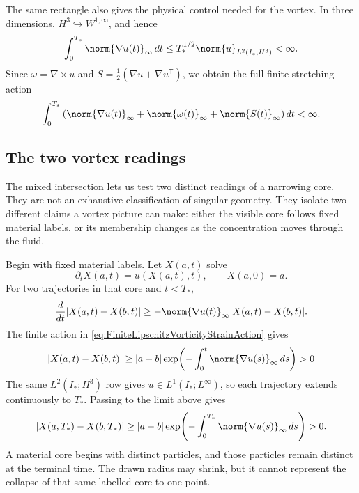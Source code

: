 The same rectangle also gives the physical control needed for the vortex.  In three dimensions,
\(H^3\hookrightarrow W^{1,\infty}\), and hence
\[
  \int_0^{T_*}\norm{\nabla u(t)}_\infty\,dt
  \leq
  T_*^{1/2}\norm{u}_{L^2(I_*;H^3)}<\infty.
\]
Since \(\omega=\nabla\times u\) and \(S=\tfrac12(\nabla u+\nabla u^{\mathsf T})\),
we obtain the full finite stretching action
\begin{equation}\label{eq:FiniteLipschitzVorticityStrainAction}
  \int_0^{T_*}
  \left(
    \norm{\nabla u(t)}_\infty
    +\norm{\omega(t)}_\infty
    +\norm{S(t)}_\infty
  \right)dt
  <\infty.
\end{equation}

\subsection{The two vortex readings}\label{sub:ClosingCriticalHeightZenoAndTheVortex}

The mixed intersection lets us test two distinct readings of a narrowing core.
They are not an exhaustive classification of singular geometry.
They isolate two different claims a vortex picture can make: either the visible core follows fixed material labels, or its membership changes as the concentration moves through the fluid.

Begin with fixed material labels.
Let \(X(a,t)\) solve
\[
  \partial_tX(a,t)=u(X(a,t),t),
  \qquad
  X(a,0)=a.
\]
For two trajectories in that core and \(t<T_*\),
\[
  \frac d{dt}|X(a,t)-X(b,t)|
  \geq
  -\norm{\nabla u(t)}_\infty|X(a,t)-X(b,t)|.
\]
The finite action in \eqref{eq:FiniteLipschitzVorticityStrainAction} gives
\begin{equation}\label{eq:BodyMaterialCoreLowerBound}
  |X(a,t)-X(b,t)|
  \geq
  |a-b|
  \exp\!\left(
    -\int_0^t\norm{\nabla u(s)}_\infty\,ds
  \right)
  >0
\end{equation}
The same \(L^2(I_*;H^3)\) row gives \(u\in L^1(I_*;L^\infty)\), so each trajectory
extends continuously to \(T_*\).  Passing to the limit above gives
\[
  |X(a,T_*)-X(b,T_*)|
  \geq |a-b|\exp\!\left(-\int_0^{T_*}\norm{\nabla u(s)}_\infty\,ds\right)>0.
\]
A material core begins with distinct particles, and those particles remain distinct at
the terminal time.  The drawn radius may shrink, but it cannot represent the collapse of
that same labelled core to one point.

